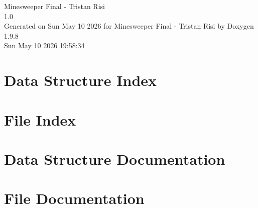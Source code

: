 \documentclass[twoside]{book}
\newcommand{\+}{\discretionary{\mbox{\scriptsize$\hookleftarrow$}}{}{}}
\newcommand{\clearemptydoublepage}{%
    \newpage{\pagestyle{empty}\cleardoublepage}%
  }
\begin{document}
  \raggedbottom
    \hypersetup{pageanchor=false,
                bookmarksnumbered=true,
                pdfencoding=unicode
               }
  \begin{titlepage}
  \vspace*{7cm}
  \begin{center}%
  {\Large Minesweeper Final -\/ Tristan Risi}\\
  [1ex]\large 1.\+0 \\
  \vspace*{1cm}
  {\large Generated on Sun May 10 2026 for Minesweeper Final -\/ Tristan Risi by Doxygen 1.9.8}\\
    \vspace*{0.5cm}
    {\small Sun May 10 2026 19:58:34}
  \end{center}
  \end{titlepage}
  \clearemptydoublepage
  \tableofcontents
  \clearemptydoublepage
  \hypersetup{pageanchor=true}
\chapter{Data Structure Index}

\chapter{File Index}

\chapter{Data Structure Documentation}

\chapter{File Documentation}
















  \backmatter
  \newpage
  \clearemptydoublepage
  \printindex
\end{document}

